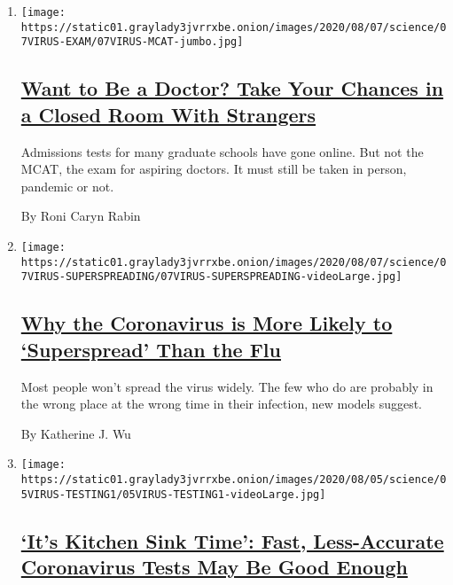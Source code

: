 \begin{enumerate}
\def\labelenumi{\arabic{enumi}.}
\item
  \texttt{[image: https://static01.graylady3jvrrxbe.onion/images/2020/08/07/science/07VIRUS-EXAM/07VIRUS-MCAT-jumbo.jpg]}

  \hypertarget{want-to-be-a-doctor-take-your-chances-in-a-closed-room-with-strangers}{%
  \subsection{\texorpdfstring{\href{/2020/08/07/health/coronavirus-exams-mcat.html}{Want
  to Be a Doctor? Take Your Chances in a Closed Room With
  Strangers}}{Want to Be a Doctor? Take Your Chances in a Closed Room With Strangers}}\label{want-to-be-a-doctor-take-your-chances-in-a-closed-room-with-strangers}}

  Admissions tests for many graduate schools have gone online. But not
  the MCAT, the exam for aspiring doctors. It must still be taken in
  person, pandemic or not.

  By Roni Caryn Rabin
\item
  \texttt{[image: https://static01.graylady3jvrrxbe.onion/images/2020/08/07/science/07VIRUS-SUPERSPREADING/07VIRUS-SUPERSPREADING-videoLarge.jpg]}

  \hypertarget{why-the-coronavirus-is-more-likely-to-superspread-than-the-flu}{%
  \subsection{\texorpdfstring{\href{/2020/08/07/health/coronavirus-superspreading-contagion.html}{Why
  the Coronavirus is More Likely to `Superspread' Than the
  Flu}}{Why the Coronavirus is More Likely to `Superspread' Than the Flu}}\label{why-the-coronavirus-is-more-likely-to-superspread-than-the-flu}}

  Most people won't spread the virus widely. The few who do are probably
  in the wrong place at the wrong time in their infection, new models
  suggest.

  By Katherine J. Wu
\item
  \texttt{[image: https://static01.graylady3jvrrxbe.onion/images/2020/08/05/science/05VIRUS-TESTING1/05VIRUS-TESTING1-videoLarge.jpg]}

  \hypertarget{its-kitchen-sink-time-fast-less-accurate-coronavirus-tests-may-be-good-enough}{%
  \subsection{\texorpdfstring{\href{/2020/08/06/health/rapid-Covid-tests.html}{`It's
  Kitchen Sink Time': Fast, Less-Accurate Coronavirus Tests May Be Good
  Enough}}{`It's Kitchen Sink Time': Fast, Less-Accurate Coronavirus Tests May Be Good Enough}}\label{its-kitchen-sink-time-fast-less-accurate-coronavirus-tests-may-be-good-enough}}


\end{enumerate}
